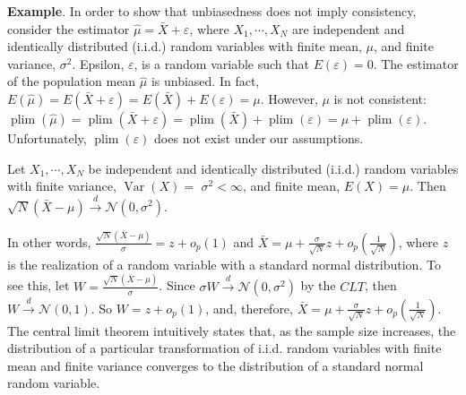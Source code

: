 \textbf{Example}. In order to show that unbiasedness does not imply consistency, consider the estimator $\widehat{\mu}=\bar{X}+\varepsilon$, where $X_{1}, \cdots, X_{N}$ are independent and identically distributed (i.i.d.) random variables with finite mean, $\mu$, and finite
variance, $\sigma^{2}$. Epsilon, $\varepsilon$, is a random variable such that $E(\varepsilon)=0$. The estimator of the population mean $\widehat{\mu}$ is unbiased. In fact, $E(\widehat{\mu})=E(\bar{X}+\varepsilon)=E(\bar{X})+E(\varepsilon)=\mu$. However, $\mu$ is not consistent: $\operatorname{plim}(\widehat{\mu})=\operatorname{plim}(\bar{X}+\varepsilon)=\operatorname{plim}(\bar{X})+\operatorname{plim}(\varepsilon)=\mu+\operatorname{plim}(\varepsilon)$. Unfortunately, $\operatorname{plim}(\varepsilon)$ does not exist under our assumptions.

\begin{theorem}
    Let $X_{1}, \cdots, X_{N}$ be independent and identically distributed (i.i.d.) random variables with finite variance, $\operatorname{Var}(X)=$ $\sigma^{2}<\infty$, and finite mean, $E(X)=\mu$. Then $\sqrt{N}(\bar{X}-\mu) \xrightarrow{d} \mathcal{N}\left(0, \sigma^{2}\right)$.
\end{theorem}
 

In other words, $\frac{\sqrt{N}(\bar{X}-\mu)}{\sigma}=z+o_{p}(1)$ and $\bar{X}=\mu+\frac{\sigma}{\sqrt{N}} z+o_{p}\left(\frac{1}{\sqrt{N}}\right)$, where $z$ is the realization of a random variable with a standard normal distribution. To see this, let $W=\frac{\sqrt{N}(\bar{X}-\mu)}{\sigma}$. Since $\sigma W \xrightarrow{d} \mathcal{N}\left(0, \sigma^{2}\right)$ by the $C L T$, then $W \xrightarrow{d} \mathcal{N}(0,1)$. So $W=z+o_{p}(1)$, and, therefore, $\bar{X}=\mu+\frac{\sigma}{\sqrt{N}} z+o_{p}\left(\frac{1}{\sqrt{N}}\right)$.
\\

The central limit theorem intuitively states that, as the sample size increases, the distribution of a particular transformation of i.i.d. random variables with finite mean and finite variance converges to the distribution of a standard normal random variable.